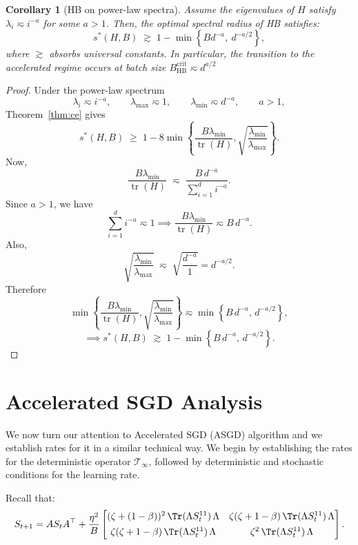 \documentclass{article}
\newtheorem{corollary}{Corollary}
\begin{document}
\begin{corollary}[HB on power-law spectra]
Assume the eigenvalues of $H$ satisfy $\lambda_i \eqsim i^{-a}$ for some $a>1$. Then, the optimal spectral radius of HB satisfies:
\[
s^*(H,B)
\;\gtrsim\;
1 - \min\!\left\{
B d^{-a},\ d^{-a/2}
\right\},
\]
where $\gtrsim$ absorbs universal constants.
In particular, the transition to the accelerated regime occurs at batch size $
B_{\mathrm{HB}}^{\mathrm{crit}}
\eqsim
d^{a/2}$
\end{corollary}
\begin{proof}
Under the power-law spectrum
\[
\lambda_i \eqsim i^{-a},
\qquad
\lambda_{\max}\eqsim 1,
\qquad
\lambda_{\min}\eqsim d^{-a},
\qquad a>1,
\]
Theorem~\ref{thm:ce} gives
\[
s^*(H,B)\;\ge\;1-8\min\!\left\{\frac{B\lambda_{\min}}{\operatorname{tr}(H)},\sqrt{\frac{\lambda_{\min}}{\lambda_{\max}}}\right\}.
\]
Now,
\[
\frac{B\lambda_{\min}}{\operatorname{tr}(H)}
\;\eqsim\;
\frac{B\,d^{-a}}{\sum_{i=1}^d i^{-a}}.
\]
Since \(a>1\), we have
\[
\sum_{i=1}^d i^{-a}\eqsim 1 \implies
\frac{B\lambda_{\min}}{\operatorname{tr}(H)}\eqsim B\,d^{-a}.
\]
Also,
\[
\sqrt{\frac{\lambda_{\min}}{\lambda_{\max}}}
\;\eqsim\;
\sqrt{\frac{d^{-a}}{1}}
=
d^{-a/2}.
\]
Therefore
\[
\min\!\left\{\frac{B\lambda_{\min}}{\operatorname{tr}(H)},\sqrt{\frac{\lambda_{\min}}{\lambda_{\max}}}\right\}
\eqsim
\min\!\left\{B\,d^{-a},\,d^{-a/2}\right\},
\]
\[
\implies s^*(H,B)\;\gtrsim\;1-\min\!\left\{B\,d^{-a},\,d^{-a/2}\right\}.
\]
\end{proof}

\section{Accelerated SGD Analysis}
\label{sec:appendix_asgd_proofs}
We now turn our attention to Accelerated SGD (ASGD) algorithm and we establish rates for it in a similar technical way. We begin by establishing the rates for the deterministic operator $\mathcal{T}_\infty$, followed by deterministic and stochastic conditions for the learning rate. 

Recall that:
\begin{equation}
S_{t+1}
=
A S_t A^\top
+
\frac{\eta^2}{B}
\begin{bmatrix}
(\zeta + (1-\beta))^2 \,\Tr(\Lambda S^{11}_{t})\, \Lambda
&
\zeta(\zeta + 1-\beta)\,\Tr(\Lambda S^{11}_{t})\, \Lambda
\\[4pt]
\zeta(\zeta + 1-\beta)\,\Tr(\Lambda S^{11}_{t})\, \Lambda
&
\zeta^2 \,\Tr(\Lambda S^{11}_{t})\, \Lambda
\end{bmatrix}.
\end{equation}
\end{document}
